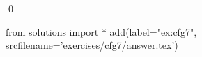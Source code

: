
\begin{ex} 
  \label{ex:cfg7}
  
  \qed
\end{ex} 
\begin{python0}
from solutions import *
add(label="ex:cfg7",
    srcfilename='exercises/cfg7/answer.tex') 
\end{python0}
